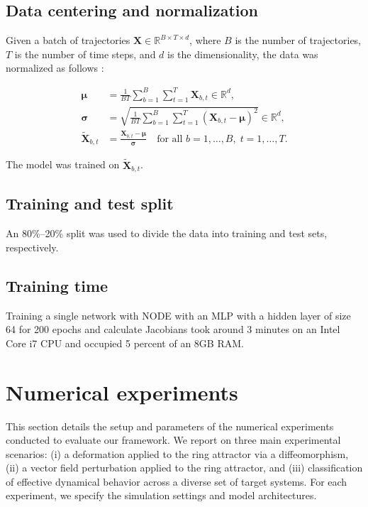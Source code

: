 \documentclass{article}
\theoremstyle{definition} \newtheorem{definition}{Definition}  \newtheorem{example}{Example}
\theoremstyle{remark} \newtheorem{remark}{Remark}
\newcounter{ct}
\begin{document}
\subsection{Data centering and normalization}
Given a batch of trajectories \( \mathbf{X} \in \mathbb{R}^{B \times T \times d} \), where \( B \) is the number of trajectories, \( T \) is the number of time steps, and \( d \) is the dimensionality, the data was normalized as follows :

\[
\begin{aligned}
\boldsymbol{\mu} &= \frac{1}{BT} \sum_{b=1}^B \sum_{t=1}^T \mathbf{X}_{b,t} \in \mathbb{R}^d, \\
\boldsymbol{\sigma} &= \sqrt{ \frac{1}{BT} \sum_{b=1}^B \sum_{t=1}^T \left( \mathbf{X}_{b,t} - \boldsymbol{\mu} \right)^2 } \in \mathbb{R}^d, \\
\tilde{\mathbf{X}}_{b,t} &= \frac{\mathbf{X}_{b,t} - \boldsymbol{\mu}}{\boldsymbol{\sigma}} \quad \text{for all } b = 1,\dots,B,\; t = 1,\dots,T.
\end{aligned}
\]

The model was trained on $\tilde{\mathbf{X}}_{b,t}$.

\subsection{Training and test split}
An 80\%--20\% split was used to divide the data into training and test sets, respectively.

\subsection{Training time}
Training a single network with NODE with an MLP with a hidden layer of size 64 for 200 epochs and calculate Jacobians took around 3 minutes on an Intel Core i7 CPU and occupied 5 percent of an 8GB RAM.



\newpage
\section{Numerical experiments}\label{sec:experiment_details}
This section details the setup and parameters of the numerical experiments conducted to evaluate our framework. We report on three main experimental scenarios: 
(i) a deformation applied to the ring attractor via a diffeomorphism, 
(ii) a vector field perturbation applied to the ring attractor, 
and (iii) classification of effective dynamical behavior across a diverse set of target systems.
 For each experiment, we specify the simulation settings and model architectures.
 
\end{document}
